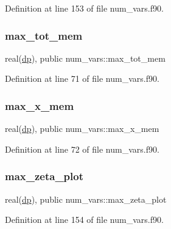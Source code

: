 Definition at line 153 of file num\+\_\+vars.\+f90.

\mbox{\label{namespacenum__vars_ae50396b7028248358850b4524cf84433}} 
\subsubsection{\texorpdfstring{max\+\_\+tot\+\_\+mem}{max\_tot\_mem}}
{\footnotesize\ttfamily real(\hyperlink{namespacenum__vars_a03802aa2bd86439d7a9370836fabf3f2}{dp}), public num\+\_\+vars\+::max\+\_\+tot\+\_\+mem}



Definition at line 71 of file num\+\_\+vars.\+f90.

\mbox{\label{namespacenum__vars_af86827817455d27248f5660c3d616283}} 
\subsubsection{\texorpdfstring{max\+\_\+x\+\_\+mem}{max\_x\_mem}}
{\footnotesize\ttfamily real(\hyperlink{namespacenum__vars_a03802aa2bd86439d7a9370836fabf3f2}{dp}), public num\+\_\+vars\+::max\+\_\+x\+\_\+mem}



Definition at line 72 of file num\+\_\+vars.\+f90.

\mbox{\label{namespacenum__vars_a2c2f75ebac91c6e5e122e41a62b71b6d}} 
\subsubsection{\texorpdfstring{max\+\_\+zeta\+\_\+plot}{max\_zeta\_plot}}
{\footnotesize\ttfamily real(\hyperlink{namespacenum__vars_a03802aa2bd86439d7a9370836fabf3f2}{dp}), public num\+\_\+vars\+::max\+\_\+zeta\+\_\+plot}



Definition at line 154 of file num\+\_\+vars.\+f90.

